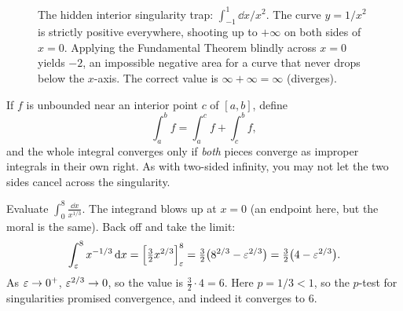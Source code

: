 \begin{figure}[H]
\centering
{}
\caption{The hidden interior singularity trap: $\int_{-1}^1 \dd x/x^2$. The curve $y=1/x^2$ is strictly positive everywhere, shooting up to $+\infty$ on both sides of $x=0$. Applying the Fundamental Theorem blindly across $x=0$ yields $-2$, an impossible negative area for a curve that never drops below the $x$-axis. The correct value is $\infty + \infty = \infty$ (diverges).}
\label{ch25:fig-hidden-singularity}
\end{figure}

\begin{definition}
\label{ch25:def-interior}
If $f$ is unbounded near an interior point $c$ of $[a,b]$, define
\[
  \int_a^{b} f = \int_a^{c} f + \int_c^{b} f,
\]
and the whole integral converges only if \emph{both} pieces converge as improper
integrals in their own right. As with two-sided infinity, you may not let the two
sides cancel across the singularity.
\end{definition}

\begin{example}
\label{ch25:ex-interior}
Evaluate $\displaystyle\int_0^{8}\frac{\dd x}{x^{1/3}}$. The integrand blows up at
$x=0$ (an endpoint here, but the moral is the same). Back off and take the limit:
\[
  \int_{\varepsilon}^{8} x^{-1/3}\,\mathrm{d} x
  = \Big[\tfrac{3}{2}x^{2/3}\Big]_{\varepsilon}^{8}
  = \tfrac{3}{2}\bigl(8^{2/3} - \varepsilon^{2/3}\bigr)
  = \tfrac{3}{2}\bigl(4 - \varepsilon^{2/3}\bigr).
\]
As $\varepsilon\to 0^+$, $\varepsilon^{2/3}\to 0$, so the value is $\tfrac{3}{2}\cdot 4 = 6$.
Here $p = 1/3 < 1$, so the $p$-test for singularities promised convergence, and
indeed it converges to $6$.
\end{example}

